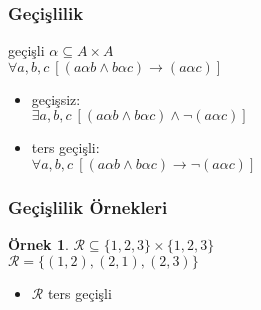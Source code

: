 \documentclass[dvipsnames]{beamer}
\theoremstyle{definition}
\theoremstyle{example}
\newtheorem{ornek}[theorem]{Örnek}
\theoremstyle{plain}
\begin{document}
\begin{frame}
  \frametitle{Geçişlilik}

  \begin{block}{geçişli}
    $\alpha \subseteq A \times A$\\
    $\forall a,b,c~[(a \alpha b \wedge b \alpha c) \rightarrow (a \alpha c)]$
  \end{block}

  \pause
  \begin{itemize}
    \item geçişsiz:\\
      $\exists a,b,c~[(a \alpha b \wedge b \alpha c) \wedge \neg (a \alpha c)]$

    \pause
    \item ters geçişli:\\
      $\forall a,b,c~[(a \alpha b \wedge b \alpha c) \rightarrow \neg (a \alpha c)]$
  \end{itemize}
\end{frame}
%
%
%
%

\begin{frame}
  \frametitle{Geçişlilik Örnekleri}

  \begin{ornek}
    $\mathcal{R} \subseteq \{1,2,3\} \times \{1,2,3\}$\\
    $\mathcal{R} = \{(1,2), (2,1), (2,3)\}$

    \medskip
    \begin{itemize}
      \item $\mathcal{R}$ ters geçişli
    \end{itemize}
  \end{ornek}
\end{frame}
\end{document}

